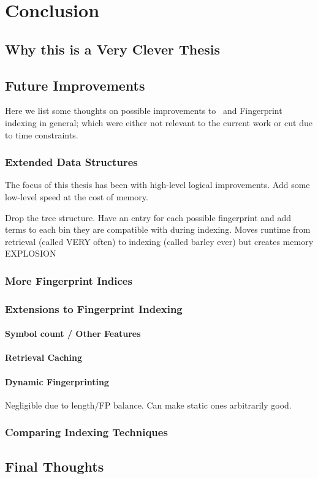 
\chapter{Conclusion}
\label{cha:conclusion}

\section{Why this is a Very Clever Thesis}
\label{sec:why}

\section{Future Improvements}
\label{sec:future}

Here we list some thoughts on possible improvements to \beagle\ and Fingerprint
indexing in general; which were either not relevant to the current work or
cut due to time constraints.

\subsection{Extended Data Structures}
The focus of this thesis has been with high-level logical improvements.
Add some low-level speed at the cost of memory.

Drop the tree structure. Have an entry for each possible fingerprint and add terms
to each bin they are compatible with during indexing. Moves runtime from
retrieval (called VERY often) to indexing (called barley ever) but creates memory
EXPLOSION

\subsection{More Fingerprint Indices}

\subsection{Extensions to Fingerprint Indexing}

\subsubsection{Symbol count / Other Features}
\subsubsection{Retrieval Caching}
\subsubsection{Dynamic Fingerprinting}
Negligible due to length/FP balance. Can make static ones arbitrarily good.

\subsection{Comparing Indexing Techniques}

\section{Final Thoughts}

